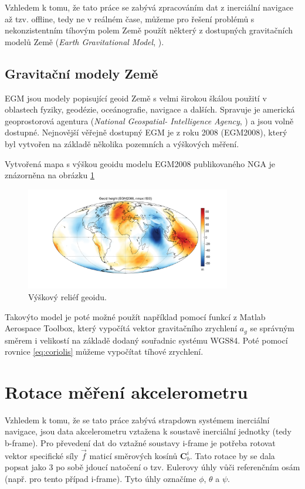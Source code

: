 Vzhledem k tomu, že tato práce se zabývá zpracováním dat z inerciální navigace až tzv. offline, tedy ne v reálném čase, můžeme pro řešení problémů s nekonzistentním tíhovým polem Země použít některý z dostupných gravitačních modelů Země (\emph{Earth
Gravitational Model}, ).

\subsection{Gravitační modely Země}
\ac{EGM} jsou modely popisující geoid Země s velmi širokou škálou použití v oblastech fyziky, geodézie, oceánografie, navigace a dalších. Spravuje je americká geoprostorová agentura (\emph{National Geospatial-
Intelligence Agency}, ) a jsou volně dostupné. Nejnovější věřejně dostupný \ac{EGM} je z roku 2008 (EGM2008), který byl vytvořen na základě několika pozemních a výškových měření. \cite{Pavlis2012}

Vytvořená mapa s výškou geoidu modelu EGM2008 publikovaného \ac{NGA} je znázorněna na obrázku \ref{fig:EGM2008}

\begin{figure}[h] 
    \centering
    \includegraphics[width=0.8\textwidth]{obrazky/EGM2008}
    \caption{Výškový reliéf geoidu. \cite{Bezdek2013}}
    \label{fig:EGM2008}
\end{figure}

Takovýto model je poté možné použít například pomocí funkcí z Matlab Aerospace Toolbox, který vypočítá vektor gravitačního zrychlení $ a_{g} $ se správným směrem i velikostí na základě dodaný souřadnic systému WGS84. Poté pomocí rovnice \ref{eq:coriolis} můžeme vypočítat tíhové zrychlení.

\section{Rotace měření akcelerometru}
Vzhledem k tomu, že se tato práce zabývá strapdown systémem inerciální navigace, jsou data akcelerometru vztažena k soustavě inerciální jednotky (tedy b-frame). Pro převedení dat do vztažné soustavy i-frame je potřeba rotovat vektor specifické síly $ \vec{f} $ maticí směrových kosínů $ \mathbf{C}_{b}^{i} $. Tato rotace by se dala popsat jako 3 po sobě jdoucí natočení o tzv. Eulerovy úhly vůči referenčním osám (např. pro tento případ i-frame). Tyto úhly označíme $ \phi $, $ \theta $ a $ \psi $. \cite{Tittertonc2004}

